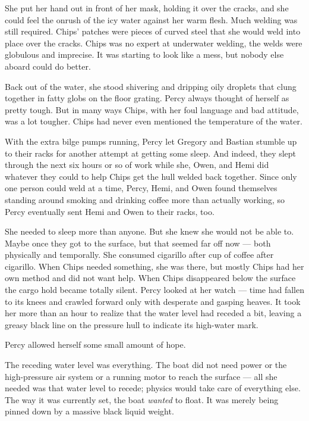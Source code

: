 \documentclass[
]{scrbook}
\begin{document}
She put her hand out in front of her mask, holding it over the cracks,
and she could feel the onrush of the icy water against her warm flesh.
Much welding was still required. Chips' patches were pieces of curved
steel that she would weld into place over the cracks. Chips was no
expert at underwater welding, the welds were globulous and imprecise. It
was starting to look like a mess, but nobody else aboard could do
better.

Back out of the water, she stood shivering and dripping oily droplets
that clung together in fatty globs on the floor grating. Percy always
thought of herself as pretty tough. But in many ways Chips, with her
foul language and bad attitude, was a lot tougher. Chips had never even
mentioned the temperature of the water.

With the extra bilge pumps running, Percy let Gregory and Bastian
stumble up to their racks for another attempt at getting some sleep. And
indeed, they slept through the next six hours or so of work while she,
Owen, and Hemi did whatever they could to help Chips get the hull welded
back together. Since only one person could weld at a time, Percy, Hemi,
and Owen found themselves standing around smoking and drinking coffee
more than actually working, so Percy eventually sent Hemi and Owen to
their racks, too.

She needed to sleep more than anyone. But she knew she would not be able
to. Maybe once they got to the surface, but that seemed far off now ---
both physically and temporally. She consumed cigarillo after cup of
coffee after cigarillo. When Chips needed something, she was there, but
mostly Chips had her own method and did not want help. When Chips
disappeared below the surface the cargo hold became totally silent.
Percy looked at her watch --- time had fallen to its knees and crawled
forward only with desperate and gasping heaves. It took her more than an
hour to realize that the water level had receded a bit, leaving a greasy
black line on the pressure hull to indicate its high-water mark.

Percy allowed herself some small amount of hope.

The receding water level was everything. The boat did not need power or
the high-pressure air system or a running motor to reach the surface ---
all she needed was that water level to recede; physics would take care
of everything else. The way it was currently set, the boat \emph{wanted}
to float. It was merely being pinned down by a massive black liquid
weight.
\end{document}

